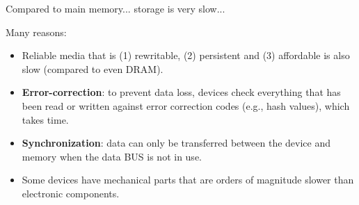 %
%



%
%
\begin{frame}{Compared to main memory... \alert{storage is very slow}...}

Many reasons:
\begin{itemize}[-]
\item Reliable media that is (1) rewritable, (2) persistent and (3) affordable is also slow (compared to even DRAM).

\item \textbf{Error-correction}: to prevent data loss, devices check everything that has been read or written against error correction codes (e.g., hash values), which takes time.

\item \textbf{Synchronization}: data can only be transferred between the device and memory when the data BUS is not in use.

\item Some devices have mechanical parts that are orders of magnitude slower than electronic components.

\end{itemize}

\end{frame}

